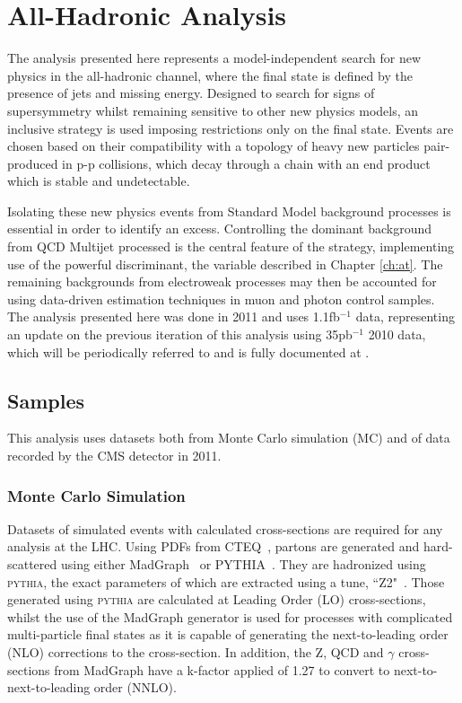 \chapter{All-Hadronic Analysis}
\label{ch:ra1}
The analysis presented here represents a model-independent search for new physics in the all-hadronic channel, where the final state is defined by the presence of jets and missing energy. Designed to search for signs of supersymmetry whilst remaining sensitive to other new physics models, an inclusive strategy is used imposing restrictions only on the final state. Events are chosen based on their compatibility with a topology of heavy new particles pair-produced in p-p collisions, which decay through a chain with an end product which is stable and undetectable.

Isolating these new physics events from Standard Model background processes is essential in order to identify an excess. Controlling the dominant background from QCD Multijet processed is the central feature of the strategy, implementing use of the powerful discriminant, the \alt variable described in Chapter \ref{ch:at}. The remaining backgrounds from electroweak processes may then be accounted for using data-driven estimation techniques in muon and photon control samples. The analysis presented here was done in 2011 and uses 1.1fb$^{-1}$ data, representing an update on the previous iteration of this analysis using 35pb$^{-1}$ 2010 data, which will be periodically referred to and is fully documented at \cite{35paper}.



\section{Samples}
This analysis uses datasets both from Monte Carlo simulation (MC) and of data recorded by the CMS detector in 2011.

\subsection{Monte Carlo Simulation}
Datasets of simulated events with calculated cross-sections are required for any analysis at the LHC. Using PDFs from CTEQ~\cite{CTEQ}, partons are generated and hard-scattered using either MadGraph~\cite{madgraph} or \textsc{PYTHIA}~\cite{pythia}. They are hadronized using \textsc{pythia}, the exact parameters of which are extracted using a tune, ``Z2"~\cite{tuneZ2}.
Those generated using \textsc{pythia} are calculated at Leading Order (LO) cross-sections, whilst the use of the MadGraph generator is used for processes with complicated multi-particle final states as it is capable of generating the next-to-leading order (NLO) corrections to the cross-section. In addition, the Z, QCD and $\gamma$ cross-sections from MadGraph have a k-factor applied of 1.27 to convert to next-to-next-to-leading order (NNLO).

